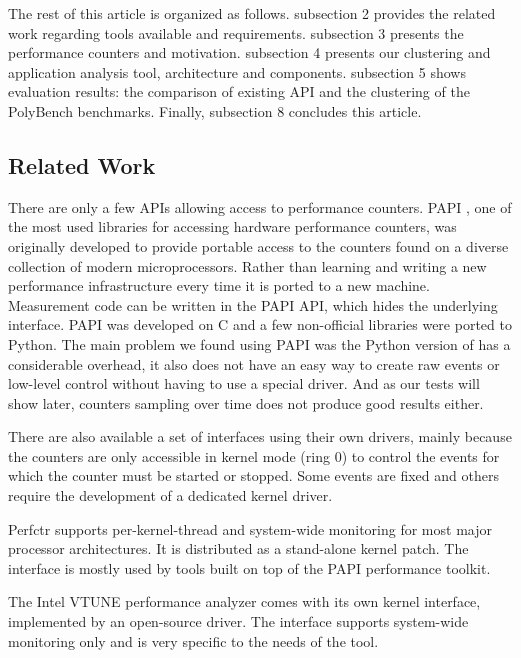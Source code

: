 The rest of this article is organized as follows. subsection 2 provides the related work regarding tools available and requirements. subsection 3 presents the performance counters and motivation. subsection 4 presents our clustering and application analysis tool, architecture and components. subsection 5 shows evaluation results: the comparison of existing API and the clustering of the PolyBench benchmarks. Finally, subsection 8 concludes this article.

\subsection{Related Work}

There are only a few APIs allowing access to performance counters.
PAPI \cite{Weaver2013Non-determinismImplementations, Mucci1999PAPI}, one of the most used libraries for accessing hardware performance counters, was originally developed to provide portable access to the counters found on a diverse collection of modern microprocessors. Rather than learning and writing a new performance infrastructure every time it is ported to a new machine. Measurement code can be written in the PAPI API, which hides the underlying interface.  
PAPI was developed on C and a few non-official libraries were ported to Python. The main problem we found using PAPI was the Python version of has a considerable overhead, it also does not have an easy way to create raw events or low-level control without having to use a special driver. And as our tests will show later, counters sampling over time does not produce good results either.

There are also available a set of interfaces using their own drivers, mainly because the counters are only accessible in kernel mode (ring 0) to control the events for which the counter must be started or stopped. Some events are fixed and others require the development of a dedicated kernel driver. 

Perfctr \cite{Nikolaev2011Perfctr} supports per-kernel-thread and system-wide monitoring for most major processor architectures. It is distributed as a stand-alone kernel patch. The interface is mostly used by tools built on top of the PAPI performance toolkit. 

The Intel VTUNE \cite{Intel2021Vtune} performance analyzer comes with its own kernel interface, implemented by an open-source driver. The interface supports system-wide monitoring only and is very specific to the needs of the tool.

